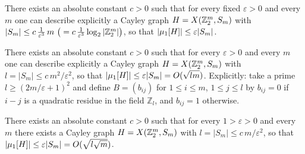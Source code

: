 \begin{proposition}
  \label{prop:prop4}
  \notready
  There exists an absolute constant $c > 0$ such that for every fixed
  $\varepsilon > 0$ and every $m$ one can describe explicitly a Cayley graph
  $H = X(\mathbb{Z}_2^{m}, S_m)$ with
  $|S_m| \le c\,\tfrac{1}{\varepsilon^{3}}\,m\ \big(= c\,\tfrac{1}{\varepsilon^{3}}
  \log_2 |\mathbb{Z}_2^{m}|\big)$, so that $|\mu_{1}[H]| \le \varepsilon|S_m|$.
\end{proposition}

\begin{proposition}
  \label{prop:prop5}
  \notready
  There exists an absolute constant $c > 0$ such that for every $\varepsilon > 0$
  and every $m$ one can describe explicitly a Cayley graph
  $H = X(\mathbb{Z}_2^{m}, S_m)$ with $l = |S_m| \le c\,m^2/\varepsilon^2$, so that
  $|\mu_{1}[H]| \le \varepsilon|S_m| = O(\sqrt{lm})$. Explicitly: take a prime
  $l \ge (2m/\varepsilon + 1)^2$ and define $B = (b_{ij})$ for $1 \le i \le m$,
  $1 \le j \le l$ by $b_{ij} = 0$ if $i - j$ is a quadratic residue in the field
  $\mathbb{Z}_l$, and $b_{ij} = 1$ otherwise.
\end{proposition}

\begin{proposition}
  \label{prop:prop6}
  \notready
  There exists an absolute constant $c > 0$ such that for every
  $1 > \varepsilon > 0$ and every $m$ there exists a Cayley graph
  $H = X(\mathbb{Z}_2^{m}, S_m)$ with $l = |S_m| \le c\,m/\varepsilon^2$, so that
  $|\mu_{1}[H]| \le \varepsilon|S_m| = O(\sqrt{l\sqrt{m}})$.
\end{proposition}

